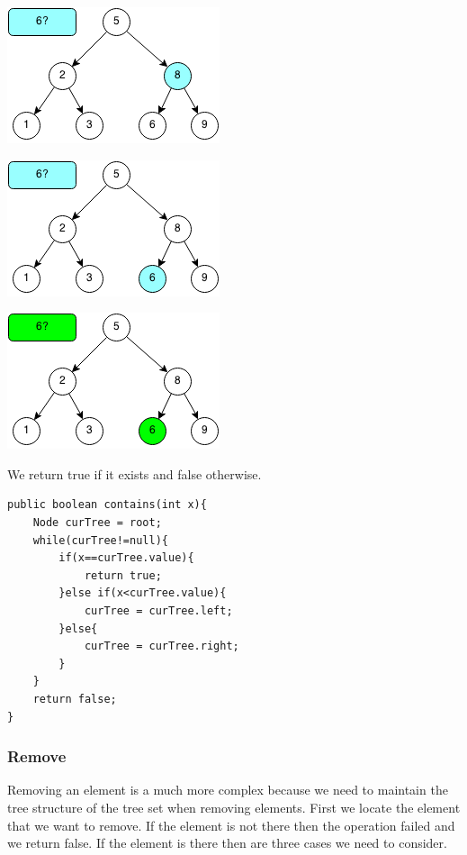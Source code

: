 \documentclass[11pt,oneside]{book}
\makeatletter
\def\maxwidth#1{\ifdim\Gin@nat@width>#1 #1\else\Gin@nat@width\fi}
\makeatother
\begin{document}
\vspace{5px}\includegraphics[width=\maxwidth{\textwidth}]{bstcontains2.png}

\vspace{5px}\includegraphics[width=\maxwidth{\textwidth}]{bstcontains3.png}

\vspace{5px}\includegraphics[width=\maxwidth{\textwidth}]{bstcontains4.png}

We return true if it exists and false otherwise.

\begin{lstlisting}
public boolean contains(int x){
    Node curTree = root;
    while(curTree!=null){
        if(x==curTree.value){
            return true;
        }else if(x<curTree.value){
            curTree = curTree.left;
        }else{
            curTree = curTree.right;
        }
    }
    return false;
}
\end{lstlisting}

\subsubsection{Remove}

Removing an element is a much more complex because we need to maintain the tree structure of the tree set when removing elements. First we locate the element that we want to remove. If the element is not there then the operation failed and we return false. If the element is there then are three cases we need to consider.
\end{document}
